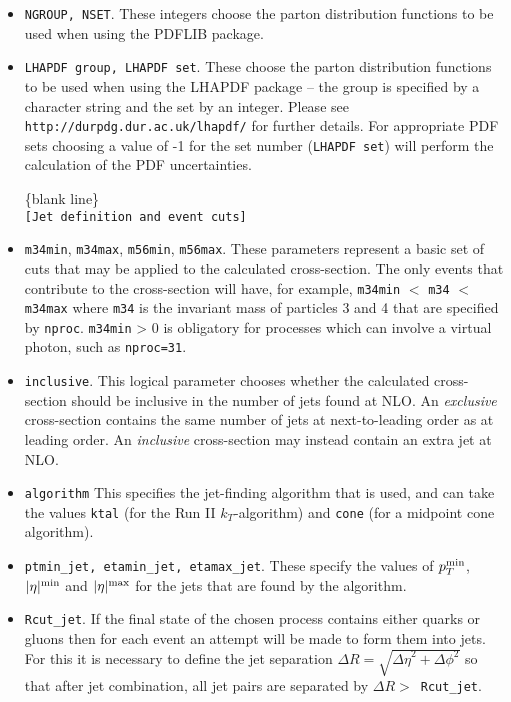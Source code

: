 \documentclass[12pt]{article}
\begin{document}
\begin{itemize}
\item {\tt NGROUP, NSET}. These integers choose the parton distribution
functions to be used when using the PDFLIB package.
\item {\tt LHAPDF group, LHAPDF set}. These choose the parton
distribution functions to be used when using the LHAPDF package --
the group is specified by a character string and the set by an integer.
Please see {\tt http://durpdg.dur.ac.uk/lhapdf/} for further details.
For appropriate PDF sets choosing a value of -1 for the set number ({\tt  LHAPDF set}) 
will perform the calculation of the PDF uncertainties.

\begin{center}
\{blank line\} \\
{\tt [Jet definition and event cuts] }
\end{center}

\item {\tt m34min}, {\tt m34max}, {\tt m56min}, {\tt m56max}.
These parameters represent a basic set of cuts that may be applied
to the calculated cross-section. The only events that contribute to
the cross-section will have, for example,
{\tt m34min} $<$ {\tt m34} $<$ {\tt m34max} where {\tt m34} is the
invariant mass of particles 3 and 4 that are specified by {\tt nproc}.
{\tt m34min} > 0 is obligatory for processes which can involve a virtual
photon, such as {\tt nproc=31}.
\item {\tt inclusive}.  This logical parameter chooses whether the
calculated cross-section should be inclusive in the number of jets
found at NLO. An {\em exclusive}
cross-section contains the same number of jets at next-to-leading
order as at leading order. An {\em inclusive} cross-section may
instead contain an extra jet at NLO.

\item {\tt algorithm} This specifies the jet-finding algorithm that
is used, and can take the values
{\tt ktal} (for the Run II $k_T$-algorithm) and {\tt cone} (for
a midpoint cone algorithm).

\item {\tt ptmin\_jet, etamin\_jet, etamax\_jet}. These specify the values
of $p_T^{\rm min}$, $|\eta|^{\rm min}$ and $|\eta|^{\rm max}$ for the
jets that are found by the algorithm. 

\item {\tt Rcut\_jet}. If the final state of the chosen process contains
either quarks or gluons then for each event an attempt will be made
to form them into jets. For this it is necessary to define the
jet separation $\Delta R=\sqrt{{\Delta \eta}^2 + {\Delta \phi}^2}$
so that after jet combination, all jet pairs are separated by
$\Delta R >$~{\tt Rcut\_jet}.


\end{itemize}
\end{document}
